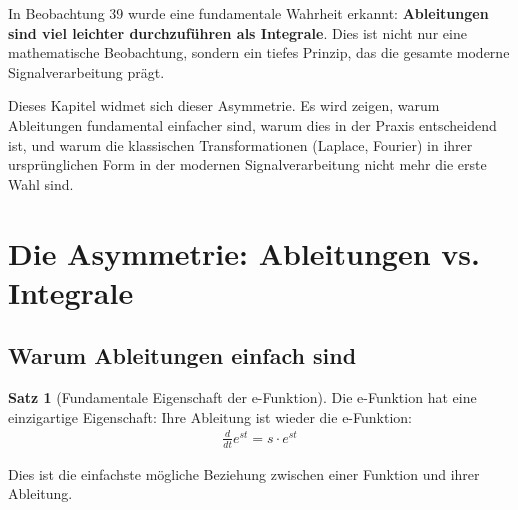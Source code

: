 ﻿\documentclass[a4paper,12pt]{report}
\theoremstyle{definition}
\newtheorem{satz}{Satz}
\begin{document}
	In Beobachtung 39 wurde eine fundamentale Wahrheit erkannt: \textbf{Ableitungen sind viel leichter durchzuführen als Integrale}. Dies ist nicht nur eine mathematische Beobachtung, sondern ein tiefes Prinzip, das die gesamte moderne Signalverarbeitung prägt.
	
	Dieses Kapitel widmet sich dieser Asymmetrie. Es wird zeigen, warum Ableitungen fundamental einfacher sind, warum dies in der Praxis entscheidend ist, und warum die klassischen Transformationen (Laplace, Fourier) in ihrer ursprünglichen Form in der modernen Signalverarbeitung nicht mehr die erste Wahl sind.
	
	\section{Die Asymmetrie: Ableitungen vs. Integrale}
	
	\subsection{Warum Ableitungen einfach sind}
	
	\begin{satz}[Fundamentale Eigenschaft der e-Funktion]
		Die e-Funktion hat eine einzigartige Eigenschaft: Ihre Ableitung ist wieder die e-Funktion:
		\begin{align}
			\frac{d}{dt} e^{st} = s \cdot e^{st}
		\end{align}
		
		Dies ist die einfachste mögliche Beziehung zwischen einer Funktion und ihrer Ableitung.
	\end{satz}
	
\end{document}
